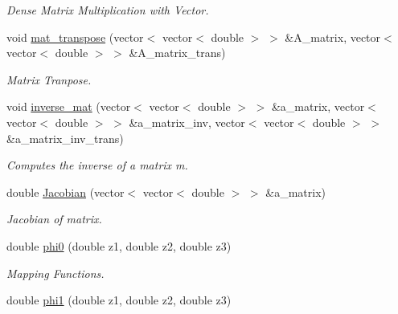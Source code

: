 \begin{DoxyCompactItemize}
\begin{DoxyCompactList}\small\item\em Dense Matrix Multiplication with Vector. \item\end{DoxyCompactList}\item 
\hypertarget{classfemfunctions_ad2a7d56348814455abbc871d6cf5f8da}{
void \hyperlink{classfemfunctions_ad2a7d56348814455abbc871d6cf5f8da}{mat\_\-transpose} (vector$<$ vector$<$ double $>$ $>$ \&A\_\-matrix, vector$<$ vector$<$ double $>$ $>$ \&A\_\-matrix\_\-trans)}
\label{classfemfunctions_ad2a7d56348814455abbc871d6cf5f8da}

\begin{DoxyCompactList}\small\item\em Matrix Tranpose. \item\end{DoxyCompactList}\item 
\hypertarget{classfemfunctions_a2662b7798d350eced7d2fea413eef60a}{
void \hyperlink{classfemfunctions_a2662b7798d350eced7d2fea413eef60a}{inverse\_\-mat} (vector$<$ vector$<$ double $>$ $>$ \&a\_\-matrix, vector$<$ vector$<$ double $>$ $>$ \&a\_\-matrix\_\-inv, vector$<$ vector$<$ double $>$ $>$ \&a\_\-matrix\_\-inv\_\-trans)}
\label{classfemfunctions_a2662b7798d350eced7d2fea413eef60a}

\begin{DoxyCompactList}\small\item\em Computes the inverse of a matrix m. \item\end{DoxyCompactList}\item 
\hypertarget{classfemfunctions_aca14e073930247f5014198d8c9cfdb19}{
double \hyperlink{classfemfunctions_aca14e073930247f5014198d8c9cfdb19}{Jacobian} (vector$<$ vector$<$ double $>$ $>$ \&a\_\-matrix)}
\label{classfemfunctions_aca14e073930247f5014198d8c9cfdb19}

\begin{DoxyCompactList}\small\item\em Jacobian of matrix. \item\end{DoxyCompactList}\item 
\hypertarget{classfemfunctions_acf903e8b2723ea178137baeaa8a424ef}{
double \hyperlink{classfemfunctions_acf903e8b2723ea178137baeaa8a424ef}{phi0} (double z1, double z2, double z3)}
\label{classfemfunctions_acf903e8b2723ea178137baeaa8a424ef}

\begin{DoxyCompactList}\small\item\em Mapping Functions. \item\end{DoxyCompactList}\item 
\hypertarget{classfemfunctions_abaf5c6ad9d655194b2da820943ec0a7e}{
double \hyperlink{classfemfunctions_abaf5c6ad9d655194b2da820943ec0a7e}{phi1} (double z1, double z2, double z3)}
\label{classfemfunctions_abaf5c6ad9d655194b2da820943ec0a7e}


\end{DoxyCompactItemize}
